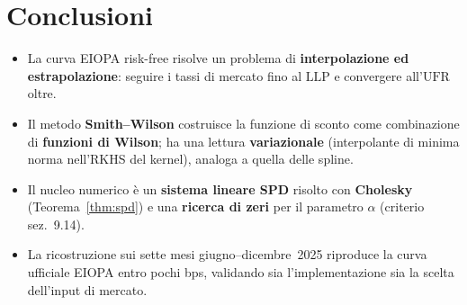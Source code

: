 \documentclass[11pt,a4paper]{article}
\theoremstyle{plain}
\theoremstyle{definition}
\theoremstyle{remark}
\newcommand{\UFR}{\ensuremath{\mathrm{UFR}}}
\newcommand{\LLP}{\ensuremath{\mathrm{LLP}}}
\begin{document}
\section{Conclusioni}

\begin{itemize}
  \item La curva EIOPA risk-free risolve un problema di \textbf{interpolazione ed
        estrapolazione}: seguire i tassi di mercato fino al $\LLP$ e convergere all'$\UFR$ oltre.
  \item Il metodo \textbf{Smith--Wilson} costruisce la funzione di sconto come combinazione di
        \textbf{funzioni di Wilson}; ha una lettura \textbf{variazionale} (interpolante di
        minima norma nell'RKHS del kernel), analoga a quella delle spline.
  \item Il nucleo numerico \`e un \textbf{sistema lineare SPD} risolto con \textbf{Cholesky}
        (Teorema~\ref{thm:spd}) e una \textbf{ricerca di zeri} per il parametro $\alpha$
        (criterio sez.~9.14).
  \item La ricostruzione sui sette mesi giugno--dicembre~2025 riproduce la curva ufficiale EIOPA
        entro pochi bps, validando sia l'implementazione sia la scelta dell'input di mercato.
\end{itemize}
\end{document}
